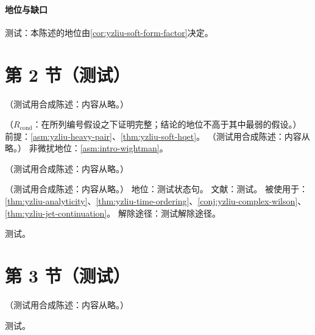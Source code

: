 \paragraph{地位与缺口}测试：本陈述的地位由\cref{cor:yzliu-soft-form-factor}决定。

\section{第 2 节（测试）}\label{sec:yzliu-soft}

\begin{example}[单圈离光锥软函数与 $S_r$]\label{ex:yzliu-soft-oneloop}
（测试用合成陈述：内容从略。）
\end{example}

\begin{corollary}\label{cor:yzliu-soft-form-factor}
（$R_{\mathrm{cond}}$：在所列编号假设之下证明完整；结论的地位不高于其中最弱的假设。）
前提：\cref{asm:yzliu-heavy-pair}、\cref{thm:yzliu-soft-hqet}。
（测试用合成陈述：内容从略。）
非微扰地位：\cref{asm:intro-wightman}。
\end{corollary}

\begin{definition}[双曲角与六种构型]\label{def:yzliu-hyperbolic-angle}
（测试用合成陈述：内容从略。）
\end{definition}

\begin{assumption}\label{asm:yzliu-wightman-pt}
（测试用合成陈述：内容从略。）
地位：测试状态句。
文献：测试。
被使用于：\cref{thm:yzliu-analyticity}、\cref{thm:yzliu-time-ordering}、\cref{conj:yzliu-complex-wilson}、\cref{thm:yzliu-jet-continuation}。
解除途径：测试解除途径。
\end{assumption}
\begin{proofsketch}测试。\end{proofsketch}

\section{第 3 节（测试）}\label{sec:yzliu-analyticity}

\begin{theorem}\label{thm:yzliu-analyticity}
（测试用合成陈述：内容从略。）
\end{theorem}
\begin{proofsketch}测试。\end{proofsketch}
